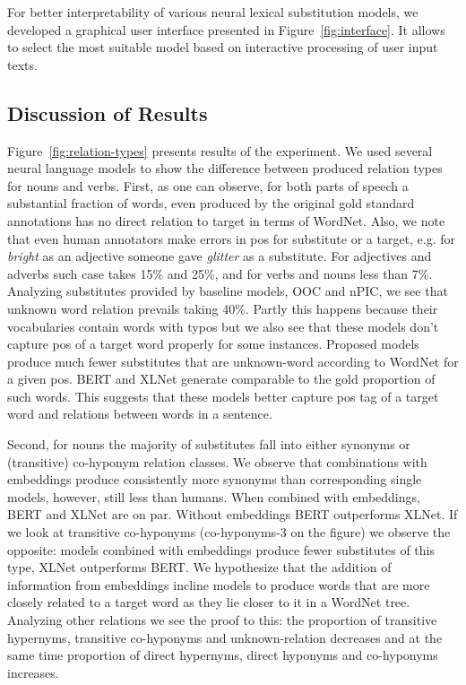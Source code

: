 \documentclass[11pt,a4paper]{article}
\begin{document}
For better interpretability of various neural lexical substitution models, we developed a graphical user interface presented in Figure~\ref{fig:interface}. It allows to select the most suitable model based on  interactive processing of user input texts. %



\subsection{Discussion of Results}

Figure~\ref{fig:relation-types} presents results of the experiment. We used several neural language models to show the difference between produced relation types for nouns and verbs. First, as one can observe, for both parts of speech a substantial fraction of words, even produced by the original gold standard annotations has no direct relation to target in terms of WordNet. Also, we note that even human annotators make errors in pos for substitute or a target, e.g. for {\it bright} as an adjective someone gave {\it glitter} as a substitute. For adjectives and adverbs such case takes 15\% and 25\%, and for verbs and nouns less than 7\%. Analyzing substitutes provided by baseline models, OOC and nPIC, we see that unknown word relation prevails taking 40\%. Partly this happens because their vocabularies contain words with typos but we also see that these models don't capture pos of a target word properly for some instances. Proposed models produce much fewer substitutes that are unknown-word according to WordNet for a given pos. BERT and XLNet generate comparable to the gold proportion of such words. This suggests that these models better capture pos tag of a target word and relations between words in a sentence.

Second, for nouns the majority of substitutes fall into either synonyms or (transitive) co-hyponym relation classes. We observe that combinations with embeddings produce consistently more synonyms than corresponding single models, however, still less than humans. When combined with embeddings, BERT and XLNet are on par. Without embeddings BERT outperforms XLNet. If we look at transitive co-hyponyms (co-hyponyms-3 on the figure) we observe the opposite: models combined with embeddings produce fewer substitutes of this type, XLNet outperforms BERT. We hypothesize that the addition of information from embeddings incline models to produce words that are more closely related to a target word as they lie closer to it in a WordNet tree. Analyzing other relations we see the proof to this: the proportion of transitive hypernyms, transitive co-hyponyms and unknown-relation decreases and at the same time proportion of direct hypernyms, direct hyponyms and co-hyponyms increases.
\end{document}
